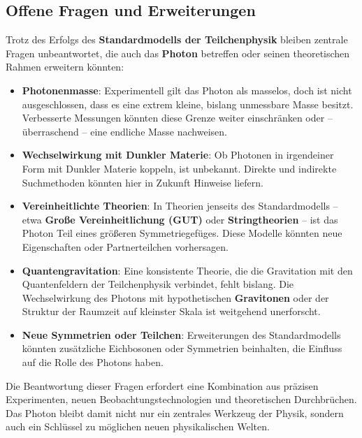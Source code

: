 \subsection{Offene Fragen und Erweiterungen}

Trotz des Erfolgs des \textbf{Standardmodells der Teilchenphysik} bleiben zentrale Fragen unbeantwortet, die auch das \textbf{Photon} betreffen oder seinen theoretischen Rahmen erweitern könnten:

\begin{itemize}
	\item \textbf{Photonenmasse}:  
	Experimentell gilt das Photon als masselos, doch ist nicht ausgeschlossen, dass es eine extrem kleine, bislang unmessbare Masse besitzt.  
	Verbesserte Messungen könnten diese Grenze weiter einschränken oder – überraschend – eine endliche Masse nachweisen.
	
	\item \textbf{Wechselwirkung mit Dunkler Materie}:  
	Ob Photonen in irgendeiner Form mit Dunkler Materie koppeln, ist unbekannt.  
	Direkte und indirekte Suchmethoden könnten hier in Zukunft Hinweise liefern.
	
	\item \textbf{Vereinheitlichte Theorien}:  
	In Theorien jenseits des Standardmodells – etwa \textbf{Große Vereinheitlichung (GUT)} oder \textbf{String\-theorien} – ist das Photon Teil eines größeren Symmetriegefüges.  
	Diese Modelle könnten neue Eigenschaften oder Partnerteilchen vorhersagen.
	
	\item \textbf{Quantengravitation}:  
	Eine konsistente Theorie, die die Gravitation mit den Quantenfeldern der Teilchenphysik verbindet, fehlt bislang.  
	Die Wechselwirkung des Photons mit hypothetischen \textbf{Gravitonen} oder der Struktur der Raumzeit auf kleinster Skala ist weitgehend unerforscht.
	
	\item \textbf{Neue Symmetrien oder Teilchen}:  
	Erweiterungen des Standardmodells könnten zusätzliche Eichbosonen oder Symmetrien beinhalten, die Einfluss auf die Rolle des Photons haben.
\end{itemize}

Die Beantwortung dieser Fragen erfordert eine Kombination aus präzisen Experimenten, neuen Beobachtungstechnologien und theoretischen Durchbrüchen.  
Das Photon bleibt damit nicht nur ein zentrales Werkzeug der Physik, sondern auch ein Schlüssel zu möglichen neuen physikalischen Welten.

